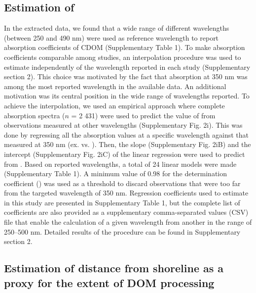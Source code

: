 \subsection*{Estimation of }

In the extracted data, we found that a wide range of different wavelengths (between 250 and 490 nm) were used as reference wavelength to report absorption coefficients of CDOM (Supplementary Table 1). To make absorption coefficients comparable among studies, an interpolation procedure was used to estimate  independently of the wavelength reported in each study (Supplementary section 2). This choice was motivated by the fact that absorption at 350 nm was among the most reported wavelength in the available data. An additional motivation was its central position in the wide range of wavelengths reported. To achieve the interpolation, we used an empirical approach where complete absorption spectra ($n$ = 2 431) were used to predict the value of  from observations measured at other wavelengths (Supplementary Fig. 2i). This was done by regressing all the absorption values at a specific wavelength against that measured at 350 nm (ex.  vs. ). Then, the slope (Supplementary Fig. 2iB) and the intercept (Supplementary Fig. 2iC) of the linear regression were used to predict  from \acdom{\lambda}. Based on reported wavelengths, a total of 24 linear models were made (Supplementary Table 1). A minimum value of 0.98 for the determination coefficient (\rr) was used as a threshold to discard observations that were too far from the targeted wavelength of 350 nm. Regression coefficients used to estimate  in this study are presented in Supplementary Table 1, but the complete list of coefficients are also provided as a supplementary comma-separated values (CSV) file that enable the calculation of a given wavelength from another in the range of 250–500 nm. Detailed results of the procedure can be found in Supplementary section 2.

\subsection*{Estimation of distance from shoreline as a proxy for the extent of DOM processing}

